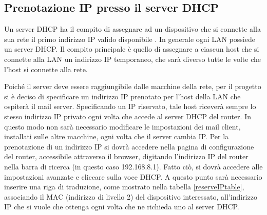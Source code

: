 \subsection{Prenotazione IP presso il server DHCP}
Un server DHCP ha il compito di assegnare ad un dispositivo che si connette alla sua rete il primo indirizzo IP 
valido disponibile \cite{DHCP1}. In generale ogni LAN possiede un server DHCP. 
Il compito principale è quello di assegnare a ciascun host che si connette alla LAN un indirizzo IP temporaneo, 
che sarà diverso tutte le volte che l’host si connette alla rete. 

Poiché il server deve essere raggiungibile dalle macchine della rete, 
per il progetto si è deciso di specificare un indirizzo IP prenotato per l’host della LAN che ospiterà il mail server. 
Specificando un IP riservato, tale host riceverà sempre lo stesso indirizzo IP privato ogni volta che accede al 
server DHCP del router. In questo modo non sarà necessario modificare le impostazioni dei mail client, 
installati sulle altre macchine, ogni volta che il server cambia IP.
Per la prenotazione di un indirizzo IP si dovrà accedere nella pagina di configurazione del router, 
accessibile attraverso il browser, digitando l’indirizzo IP del router nella barra di ricerca 
(in questo caso 192.168.8.1). Fatto ciò, si dovrà accedere alle impostazioni avanzate e cliccare sulla voce DHCP. 
A questo punto sarà necessario inserire una riga di traduzione, come mostrato nella tabella \ref{reserveIPtable},
associando il MAC (indirizzo di livello 2) del dispositivo interessato, all’indirizzo IP che si vuole che ottenga 
ogni volta che ne richieda uno al server DHCP.

\begin{table}[htp]
    \centering
    \caption{Tabella per l'assegnazione di un indirizzo IP riservato}\label{reserveIPtable}
    \end{table}

